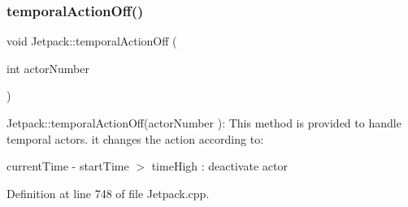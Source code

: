 \mbox{\label{class_jetpack_a2991b302cd99bf89325f9b66b104d575}} 
\subsubsection{\texorpdfstring{temporal\+Action\+Off()}{temporalActionOff()}}
{\footnotesize\ttfamily void Jetpack\+::temporal\+Action\+Off (\begin{DoxyParamCaption}\item[{int}]{actor\+Number }\end{DoxyParamCaption})}

Jetpack\+::temporal\+Action\+Off(actor\+Number )\+: This method is provided to handle temporal actors. it changes the action according to\+:

current\+Time -\/ start\+Time $>$ time\+High \+: deactivate actor 

Definition at line 748 of file Jetpack.\+cpp.


